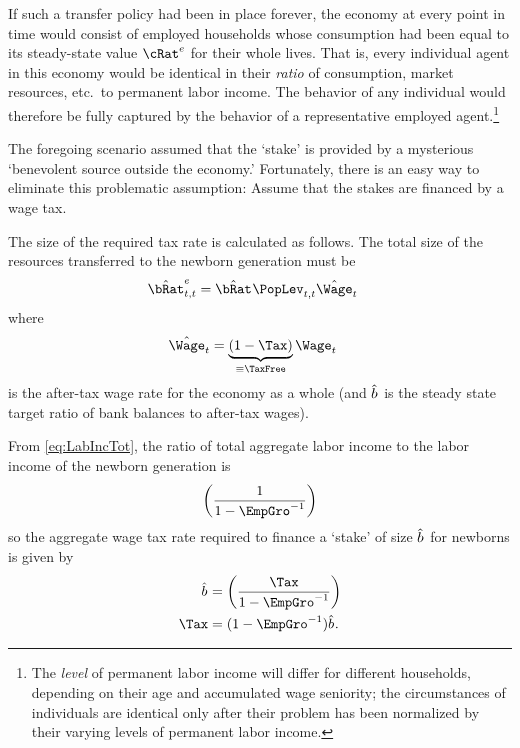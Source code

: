 \documentclass{\handout}
\begin{document}
If such a transfer policy had been in place forever, the economy at every 
point in time would consist of employed households whose consumption had 
been equal to its steady-state value ${\cRat}^{e}$ for their whole lives.  That is, every 
individual agent in this economy would be identical in their {\it ratio} of consumption,
market resources, etc.\ to permanent labor income.  
The behavior of any individual would therefore be fully captured by the behavior
of a representative employed agent.\footnote{The {\it level} of permanent 
labor income will differ for different households, depending on their age
and accumulated wage seniority; the circumstances of individuals are identical
only after their problem has been normalized by their varying levels of permanent 
labor income.}

The foregoing scenario assumed that the `stake' is provided by a mysterious
`benevolent source outside the economy.'  Fortunately, there is an
easy way to eliminate this problematic assumption: Assume that the
stakes are financed by a wage tax.

The size of the required tax rate is calculated as follows.  The total size
of the resources transferred to the newborn generation must be
\begin{equation}\begin{gathered}\begin{aligned}
  \hat{\bRat}^{e}_{t,t} & =  \hat{\bRat}^{\null} \PopLev_{t,t} \hat{\Wage}_{t}
\end{aligned}\end{gathered}\end{equation}
where
\begin{equation}\begin{gathered}\begin{aligned}
  \hat{\Wage}_{t} & =  \underbrace{\left(1-\Tax \right)}_{\equiv \TaxFree}\Wage_{t}
\end{aligned}\end{gathered}\end{equation}
is the after-tax wage rate for the economy as a whole (and $\hat{b}^{\null}$ is the steady state target ratio of bank balances to after-tax wages).

From \eqref{eq:LabIncTot}, the ratio of total aggregate labor income 
to the labor income of the newborn generation is 
\begin{equation}\begin{gathered}\begin{aligned}
  \left(\frac{1}{1-\EmpGro^{-1}}\right)
\end{aligned}\end{gathered}\end{equation}
so the aggregate wage tax rate required to finance a `stake' of size $\hat{b}^{\null}$ for
newborns is given by 
\begin{equation}\begin{gathered}\begin{aligned}
  \hat{b}^{\null} & =    \left(\frac{\Tax}{1-\EmpGro^{-1}}\right)
\\ \Tax & =  (1-\EmpGro^{-1})\hat{b}^{\null}
.
\end{aligned}\end{gathered}\end{equation}
\end{document}
